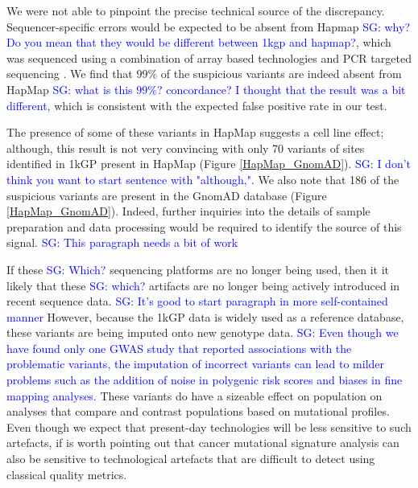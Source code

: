 \documentclass[9pt,lineno]{elife}
\newcommand{\sgcomment}[1]{\textcolor{blue}{SG: #1}}
\begin{document}
We were not able to pinpoint the precise technical source of the discrepancy. 
Sequencer-specific errors would be expected to be absent from Hapmap \sgcomment{why? Do you mean that they would be different between 1kgp and hapmap?}, which was sequenced using a combination of array based technologies and PCR targeted sequencing \citep{HapMap2005}. 
We find that $99\%$ of the suspicious variants are indeed absent from HapMap \sgcomment{what is this $99\%$? concordance? I thought that the result was a bit different}, which is consistent with the expected false positive rate in our test.
  
The presence of some of these variants in HapMap suggests a cell line effect; although, this result is not very convincing with only 70 variants of sites identified in 1kGP present in HapMap (Figure \ref{HapMap_GnomAD}). \sgcomment{I don't think you want to start sentence with "although,". }
We also note that 186 of the suspicious variants are present in the GnomAD database (Figure \ref{HapMap_GnomAD}).
Indeed, further inquiries into the details of sample preparation and data processing would be required to identify the source of this signal. \sgcomment{This paragraph needs a bit of work}

If these \sgcomment{Which?} sequencing platforms are no longer being used, then it it likely that these \sgcomment{which?} artifacts are no longer being actively introduced in recent sequence data. \sgcomment{It's good to start paragraph in more self-contained manner}
However, because the 1kGP data is widely used as a reference database, these variants are being imputed onto new genotype data.
\sgcomment{Even though we have found only one GWAS study that reported associations with the problematic variants, the imputation of incorrect variants can lead to milder problems such as the addition of noise in polygenic risk scores and biases in fine mapping analyses. }  
These variants do have a sizeable effect on population on analyses that compare and contrast populations based on mutational profiles. Even though we expect that present-day technologies will be less sensitive to such artefacts, if is worth pointing out that cancer mutational signature analysis can also be sensitive to technological artefacts that are difficult to detect using classical quality metrics. 
\end{document}
